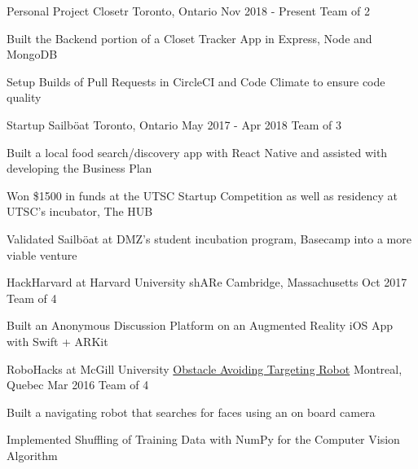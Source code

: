 \begin{cventries}
\cventry
    {Personal Project}
    {Closetr}
    {Toronto, Ontario}
    {Nov 2018 - Present}
    {Team of 2}
    {
      \begin{cvitems}
        \item{Built the Backend portion of a Closet Tracker App in Express, Node and MongoDB}
        \item{Setup Builds of Pull Requests in CircleCI and Code Climate to ensure code quality}
      \end{cvitems}
    }
\cventry
  {Startup}
  {Sailböat}
  {Toronto, Ontario}
  {May 2017 - Apr 2018}
  {Team of 3}
  {
    \begin{cvitems}
      \item {Built a local food search/discovery app with React Native and assisted with developing the Business Plan}
      \item {Won \$1500 in funds at the UTSC Startup Competition as well as residency at UTSC's incubator, The HUB}
      \item {Validated Sailböat at DMZ's student incubation program, Basecamp into a more viable venture}
    \end{cvitems}
  }
\cventry
  {HackHarvard at Harvard University}
  {shARe}
  {Cambridge, Massachusetts}
  {Oct 2017}
  {Team of 4}
  {
    \begin{cvitems}
      \item {Built an Anonymous Discussion Platform on an Augmented Reality iOS App with Swift + ARKit}
    \end{cvitems}
  }
\cventry
  {RoboHacks at McGill University}
  {\href{https://github.com/PhABC/HeadHunterBots}{Obstacle Avoiding Targeting Robot}}
  {Montreal, Quebec}
  {Mar 2016}
  {Team of 4}
  {
    \begin{cvitems}
      \item {Built a navigating robot that searches for faces using an on board camera}
      \item {Implemented Shuffling of Training Data with NumPy for the Computer Vision Algorithm}
    \end{cvitems}
  }
\end{cventries}
